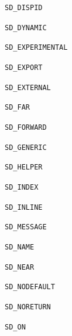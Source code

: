 \documentclass{report}
\begin{document}
\begin{list}{}
\begin{description}
\item[\texttt{SD{\_}DISPID}] \label{PasDoc_Tokenizer-SD_DISPID}
\index{}
 
\item[\texttt{SD{\_}DYNAMIC}] \label{PasDoc_Tokenizer-SD_DYNAMIC}
\index{}
 
\item[\texttt{SD{\_}EXPERIMENTAL}] \label{PasDoc_Tokenizer-SD_EXPERIMENTAL}
\index{}
 
\item[\texttt{SD{\_}EXPORT}] \label{PasDoc_Tokenizer-SD_EXPORT}
\index{}
 
\item[\texttt{SD{\_}EXTERNAL}] \label{PasDoc_Tokenizer-SD_EXTERNAL}
\index{}
 
\item[\texttt{SD{\_}FAR}] \label{PasDoc_Tokenizer-SD_FAR}
\index{}
 
\item[\texttt{SD{\_}FORWARD}] \label{PasDoc_Tokenizer-SD_FORWARD}
\index{}
 
\item[\texttt{SD{\_}GENERIC}] \label{PasDoc_Tokenizer-SD_GENERIC}
\index{}
 
\item[\texttt{SD{\_}HELPER}] \label{PasDoc_Tokenizer-SD_HELPER}
\index{}
 
\item[\texttt{SD{\_}INDEX}] \label{PasDoc_Tokenizer-SD_INDEX}
\index{}
 
\item[\texttt{SD{\_}INLINE}] \label{PasDoc_Tokenizer-SD_INLINE}
\index{}
 
\item[\texttt{SD{\_}MESSAGE}] \label{PasDoc_Tokenizer-SD_MESSAGE}
\index{}
 
\item[\texttt{SD{\_}NAME}] \label{PasDoc_Tokenizer-SD_NAME}
\index{}
 
\item[\texttt{SD{\_}NEAR}] \label{PasDoc_Tokenizer-SD_NEAR}
\index{}
 
\item[\texttt{SD{\_}NODEFAULT}] \label{PasDoc_Tokenizer-SD_NODEFAULT}
\index{}
 
\item[\texttt{SD{\_}NORETURN}] \label{PasDoc_Tokenizer-SD_NORETURN}
\index{}
 
\item[\texttt{SD{\_}ON}] \label{PasDoc_Tokenizer-SD_ON}
\index{}
 

\end{description}
\end{list}
\end{document}
